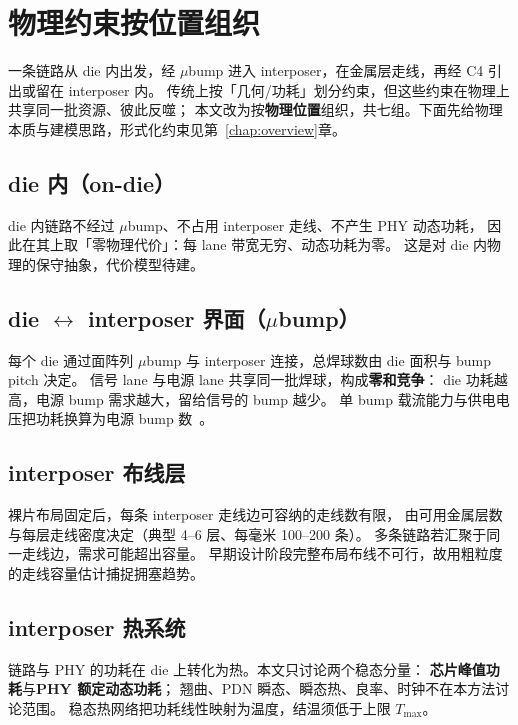 \section{物理约束按位置组织}\label{sec:bg-constraints}

一条链路从 die 内出发，经 $\mu$bump 进入 interposer，在金属层走线，再经 C4 引出或留在 interposer 内。
传统上按「几何/功耗」划分约束，但这些约束在物理上共享同一批资源、彼此反噬；
本文改为按\textbf{物理位置}组织，共七组。下面先给物理本质与建模思路，形式化约束见第~\ref{chap:overview}章。

\subsection{die 内（on-die）}\label{sec:bg-ondie}

die 内链路不经过 $\mu$bump、不占用 interposer 走线、不产生 PHY 动态功耗，
因此在其上取「零物理代价」：每 lane 带宽无穷、动态功耗为零。
这是对 die 内物理的保守抽象，代价模型待建。

\subsection{die $\leftrightarrow$ interposer 界面（$\mu$bump）}\label{sec:bg-ubump}

每个 die 通过面阵列 $\mu$bump 与 interposer 连接，总焊球数由 die 面积与 bump pitch 决定。
信号 lane 与电源 lane 共享同一批焊球，构成\textbf{零和竞争}：
die 功耗越高，电源 bump 需求越大，留给信号的 bump 越少。
单 bump 载流能力与供电电压把功耗换算为电源 bump 数~\cite{electrical-thermal-chiplet2024}。

\subsection{interposer 布线层}\label{sec:bg-wiring}

裸片布局固定后，每条 interposer 走线边可容纳的走线数有限，
由可用金属层数与每层走线密度决定（典型 4--6 层、每毫米 100--200 条）。
多条链路若汇聚于同一走线边，需求可能超出容量。
早期设计阶段完整布局布线不可行，故用粗粒度的走线容量估计捕捉拥塞趋势。

\subsection{interposer 热系统}\label{sec:bg-thermal}

链路与 PHY 的功耗在 die 上转化为热。本文只讨论两个稳态分量：
\textbf{芯片峰值功耗}与\textbf{PHY 额定动态功耗}；
翘曲、PDN 瞬态、瞬态热、良率、时钟不在本方法讨论范围。
稳态热网络把功耗线性映射为温度，结温须低于上限 $T_{\max}$。

